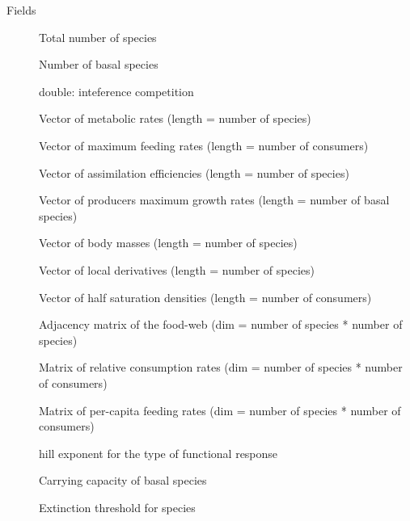 \documentclass[letterpaper]{book}
\begin{document}
\begin{Section}{Fields}

\begin{description}

\item[] Total number of species

\item[] Number of basal species

\item[] double: inteference competition

\item[] Vector of metabolic rates (length = number of species)

\item[] Vector of maximum feeding rates (length = number of consumers)

\item[] Vector of assimilation efficiencies (length = number of species)

\item[] Vector of producers maximum growth rates (length = number of basal species)

\item[] Vector of body masses (length = number of species)

\item[] Vector of local derivatives (length = number of species)

\item[] Vector of half saturation densities (length = number of consumers)

\item[] Adjacency matrix of the food-web (dim = number of species * number of species)

\item[] Matrix of relative consumption rates (dim = number of species * number of consumers)

\item[] Matrix of per-capita feeding rates (dim = number of species * number of consumers)

\item[] hill exponent for the type of functional response

\item[] Carrying capacity of basal species

\item[] Extinction threshold for species


\end{description}
\end{Section}
\end{document}
